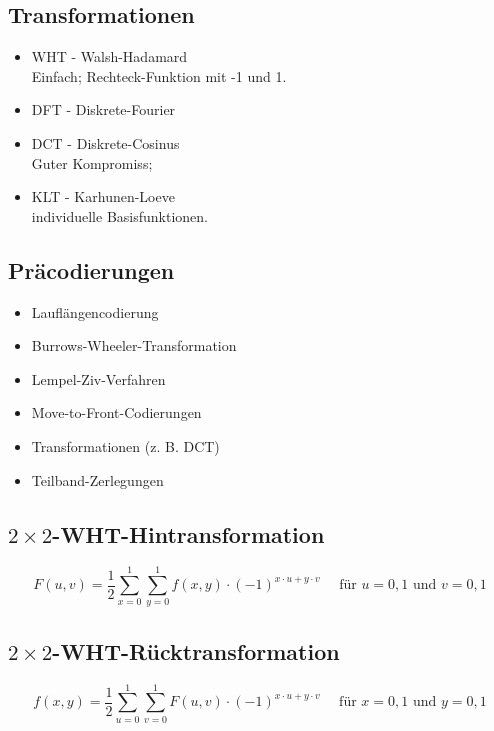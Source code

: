 \begin{multicols}{2}

\subsection*{Transformationen}
\begin{minipage}{\columnwidth}
\begin{itemize}
	\setlength{\parskip}{0pt}
	\setlength{\itemsep}{0pt}
	\item WHT - Walsh-Hadamard\\
			Einfach; Rechteck-Funktion mit -1 und 1.
	\item DFT - Diskrete-Fourier
	\item DCT - Diskrete-Cosinus\\
			Guter Kompromiss; 
	\item KLT - Karhunen-Loeve\\
			individuelle Basisfunktionen.
\end{itemize}
\end{minipage}

\subsection*{Präcodierungen}
\begin{minipage}{\columnwidth}
\begin{itemize}
	\setlength{\parskip}{0pt}
	\setlength{\itemsep}{0pt}
	\item Lauflängencodierung
	\item Burrows-Wheeler-Transformation
	\item Lempel-Ziv-Verfahren
	\item Move-to-Front-Codierungen
	\item Transformationen (z. B. DCT)
	\item Teilband-Zerlegungen
\end{itemize}
\end{minipage}

\end{multicols}

\subsection*{$2 \times 2$-WHT-Hintransformation}
\[
    F(u, v) = \frac{1}{2} \sum_{x=0}^{1} \sum_{y=0}^{1} f(x, y) \cdot {(-1)}^{x \cdot u + y \cdot v}
        \quad \mbox{ für } u = 0, 1 \mbox{ und } v = 0, 1
\]

\subsection*{$2 \times 2$-WHT-Rücktransformation}
\[
    f(x, y) = \frac{1}{2} \sum_{u=0}^{1} \sum_{v=0}^{1} F(u, v) \cdot {(-1)}^{x \cdot u + y \cdot v}
        \quad \mbox{ für } x = 0, 1 \mbox{ und } y = 0, 1
\]

